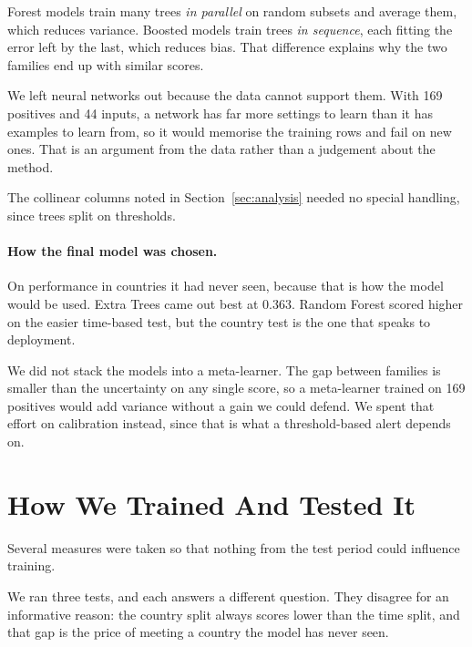 \documentclass[10pt]{article}
\begin{document}
Forest models train many trees \emph{in parallel} on random subsets and average them,
which reduces variance. Boosted models train trees \emph{in sequence}, each fitting the
error left by the last, which reduces bias. That difference explains why the two families
end up with similar scores.

We left neural networks out because the data cannot support them. With 169 positives and
44 inputs, a network has far more settings to learn than it has examples to learn from,
so it would memorise the training rows and fail on new ones. That is an argument from the
data rather than a judgement about the method.

The collinear columns noted in Section~\ref{sec:analysis} needed no special handling, since
trees split on thresholds.

\paragraph{How the final model was chosen.} On performance in countries it had never seen,
because that is how the model would be used. Extra Trees came out best at 0.363. Random
Forest scored higher on the easier time-based test, but the country test is the one that
speaks to deployment.

We did not stack the models into a meta-learner. The gap between families is smaller than
the uncertainty on any single score, so a meta-learner trained on 169 positives would add
variance without a gain we could defend. We spent that effort on calibration instead, since
that is what a threshold-based alert depends on.

\section{How We Trained And Tested It}
\label{sec:eval}

Several measures were taken so that nothing from the test period could influence training.

We ran three tests, and each answers a different question. They disagree for an
informative reason: the country split always scores lower than the time split, and that
gap is the price of meeting a country the model has never seen.
\end{document}
